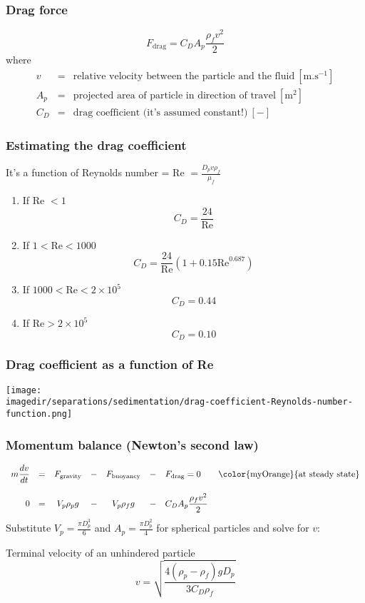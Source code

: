 \begin{frame}\frametitle{Drag force}
	\[
	 	F_\text{drag} = C_D A_p \frac{\rho_f v^2}{2}
	\]
	where
	\[
		\begin{array}{rcl}
			v	&=& \text{relative velocity between the particle and the fluid}~[\text{m.s}^{-1}] \\
			A_p &=& \text{projected area of particle in direction of travel}~[\text{m}^2] \\
			C_D	&=& \text{drag coefficient (it's assumed constant!)}~[-]
		\end{array}
	\]
\end{frame}

\begin{frame}\frametitle{Estimating the drag coefficient}
	It's a function of Reynolds number = Re $= \displaystyle \frac{D_p v \rho_f}{\mu_f}$ \\
	\begin{enumerate}
		\item	If Re $< 1$
				\[
					C_D = \frac{24}{\text{Re}}
				\]
				
		\item	If $1 < \text{Re} < \text{1000}$
				\[
					C_D = \frac{24}{\text{Re}}\left(1 + 0.15 \text{Re}^{0.687} \right)
				\]
		\item	If $\text{1000} < \text{Re} < 2\times10^5 $
				\[
					C_D = 0.44
				\]
		\item	If $\text{Re} > 2\times10^5 $
				\[
					C_D = 0.10
				\]			
	\end{enumerate}	
\end{frame}

\begin{frame}\frametitle{Drag coefficient as a function of Re}
	\begin{center}
		\texttt{[image: \\imagedir/separations/sedimentation/drag-coefficient-Reynolds-number-function.png]}
	\end{center}
\end{frame}

\begin{frame}\frametitle{Momentum balance (Newton's second law)}	
	\[
	\begin{array}{rcccccl}
		\displaystyle m\frac{dv}{dt} &=&  F_\text{gravity} &-& F_\text{buoyancy} &-& F_\text{drag} = 0 \qquad \text{\color{myOrange}{at steady state}} \\		
		\\
		0 &=&  V_p \rho_p g &-& V_p \rho_f g &-& C_D A_p \displaystyle \frac{\rho_f v^2}{2} 
	\end{array}
	\]
	Substitute $V_p = \displaystyle \frac{\pi D_p^3}{6}$ and $A_p = \displaystyle \frac{\pi D_p^2}{4}$ for spherical particles and solve for $v$:
	
	\begin{exampleblock}{Terminal velocity of an unhindered particle}
		\[
			v = \sqrt{\frac{4\left(\rho_p - \rho_f \right)g D_p}{3 C_D \rho_f}}
		\]
	\end{exampleblock}
\end{frame}

